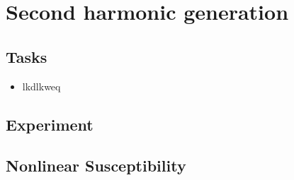 \renewcommand{\lastmod}{May 7, 2020}
\chapter{Second harmonic generation}


\section{Tasks}

\begin{itemize}
\item lkdlkweq
\end{itemize}

\section{Experiment}


\section{Nonlinear Susceptibility}

